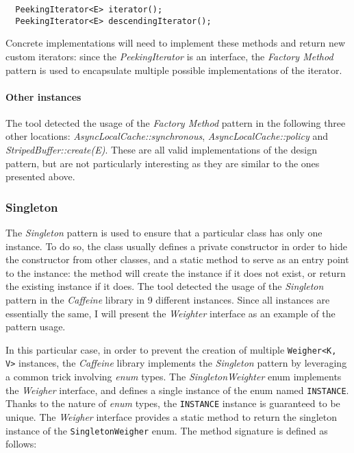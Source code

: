 \begin{lstlisting}
  PeekingIterator<E> iterator();
  PeekingIterator<E> descendingIterator();
\end{lstlisting}

\noindent Concrete implementations will need to implement these methods and return new custom iterators: since the \textit{PeekingIterator} is an interface, the \textit{Factory Method} pattern is used to encapsulate multiple possible implementations of the iterator.

\paragraph{Other instances} The tool detected the usage of the \textit{Factory Method} pattern in the following three other locations: \textit{AsyncLocalCache::synchronous}, \textit{AsyncLocalCache::policy} and  \textit{StripedBuffer::create(E)}. These are all valid implementations of the design pattern, but are not particularly interesting as they are similar to the ones presented above.

\subsubsection{Singleton}
\label{sec:singleton}

The \textit{Singleton} pattern is used to ensure that a particular class has only one instance. To do so, the class usually defines a private constructor in order to hide the constructor from other classes, and a static method to serve as an entry point to the instance: the method will create the instance if it does not exist, or return the existing instance if it does. The tool detected the usage of the \textit{Singleton} pattern in the \textit{Caffeine} library in 9 different instances. Since all instances are essentially the same, I will present the \textit{Weighter} interface as an example of the pattern usage.

In this particular case, in order to prevent the creation of multiple \texttt{Weigher<K, V>} instances, the \textit{Caffeine} library implements the \textit{Singleton} pattern by leveraging a common trick involving \textit{enum} types. The \textit{SingletonWeighter} enum implements the \textit{Weigher} interface, and defines a single instance of the enum named \texttt{INSTANCE}. Thanks to the nature of \textit{enum} types, the \texttt{INSTANCE} instance is guaranteed to be unique. The \textit{Weigher} interface provides a static method to return the singleton instance of the \texttt{SingletonWeigher} enum. The method signature is defined as follows:

